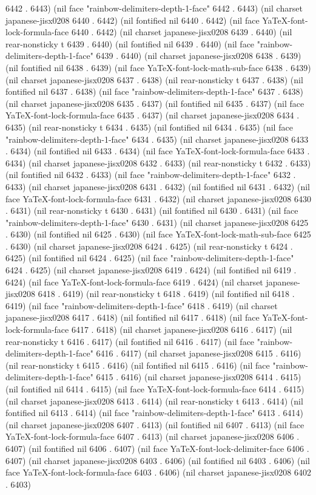 6442 . 6443) (nil face "rainbow-delimiters-depth-1-face" 6442 . 6443) (nil charset japanese-jisx0208 6440 . 6442) (nil fontified nil 6440 . 6442) (nil face YaTeX-font-lock-formula-face 6440 . 6442) (nil charset japanese-jisx0208 6439 . 6440) (nil rear-nonsticky t 6439 . 6440) (nil fontified nil 6439 . 6440) (nil face "rainbow-delimiters-depth-1-face" 6439 . 6440) (nil charset japanese-jisx0208 6438 . 6439) (nil fontified nil 6438 . 6439) (nil face YaTeX-font-lock-math-sub-face 6438 . 6439) (nil charset japanese-jisx0208 6437 . 6438) (nil rear-nonsticky t 6437 . 6438) (nil fontified nil 6437 . 6438) (nil face "rainbow-delimiters-depth-1-face" 6437 . 6438) (nil charset japanese-jisx0208 6435 . 6437) (nil fontified nil 6435 . 6437) (nil face YaTeX-font-lock-formula-face 6435 . 6437) (nil charset japanese-jisx0208 6434 . 6435) (nil rear-nonsticky t 6434 . 6435) (nil fontified nil 6434 . 6435) (nil face "rainbow-delimiters-depth-1-face" 6434 . 6435) (nil charset japanese-jisx0208 6433 . 6434) (nil fontified nil 6433 . 6434) (nil face YaTeX-font-lock-formula-face 6433 . 6434) (nil charset japanese-jisx0208 6432 . 6433) (nil rear-nonsticky t 6432 . 6433) (nil fontified nil 6432 . 6433) (nil face "rainbow-delimiters-depth-1-face" 6432 . 6433) (nil charset japanese-jisx0208 6431 . 6432) (nil fontified nil 6431 . 6432) (nil face YaTeX-font-lock-formula-face 6431 . 6432) (nil charset japanese-jisx0208 6430 . 6431) (nil rear-nonsticky t 6430 . 6431) (nil fontified nil 6430 . 6431) (nil face "rainbow-delimiters-depth-1-face" 6430 . 6431) (nil charset japanese-jisx0208 6425 . 6430) (nil fontified nil 6425 . 6430) (nil face YaTeX-font-lock-math-sub-face 6425 . 6430) (nil charset japanese-jisx0208 6424 . 6425) (nil rear-nonsticky t 6424 . 6425) (nil fontified nil 6424 . 6425) (nil face "rainbow-delimiters-depth-1-face" 6424 . 6425) (nil charset japanese-jisx0208 6419 . 6424) (nil fontified nil 6419 . 6424) (nil face YaTeX-font-lock-formula-face 6419 . 6424) (nil charset japanese-jisx0208 6418 . 6419) (nil rear-nonsticky t 6418 . 6419) (nil fontified nil 6418 . 6419) (nil face "rainbow-delimiters-depth-1-face" 6418 . 6419) (nil charset japanese-jisx0208 6417 . 6418) (nil fontified nil 6417 . 6418) (nil face YaTeX-font-lock-formula-face 6417 . 6418) (nil charset japanese-jisx0208 6416 . 6417) (nil rear-nonsticky t 6416 . 6417) (nil fontified nil 6416 . 6417) (nil face "rainbow-delimiters-depth-1-face" 6416 . 6417) (nil charset japanese-jisx0208 6415 . 6416) (nil rear-nonsticky t 6415 . 6416) (nil fontified nil 6415 . 6416) (nil face "rainbow-delimiters-depth-1-face" 6415 . 6416) (nil charset japanese-jisx0208 6414 . 6415) (nil fontified nil 6414 . 6415) (nil face YaTeX-font-lock-formula-face 6414 . 6415) (nil charset japanese-jisx0208 6413 . 6414) (nil rear-nonsticky t 6413 . 6414) (nil fontified nil 6413 . 6414) (nil face "rainbow-delimiters-depth-1-face" 6413 . 6414) (nil charset japanese-jisx0208 6407 . 6413) (nil fontified nil 6407 . 6413) (nil face YaTeX-font-lock-formula-face 6407 . 6413) (nil charset japanese-jisx0208 6406 . 6407) (nil fontified nil 6406 . 6407) (nil face YaTeX-font-lock-delimiter-face 6406 . 6407) (nil charset japanese-jisx0208 6403 . 6406) (nil fontified nil 6403 . 6406) (nil face YaTeX-font-lock-formula-face 6403 . 6406) (nil charset japanese-jisx0208 6402 . 6403) 